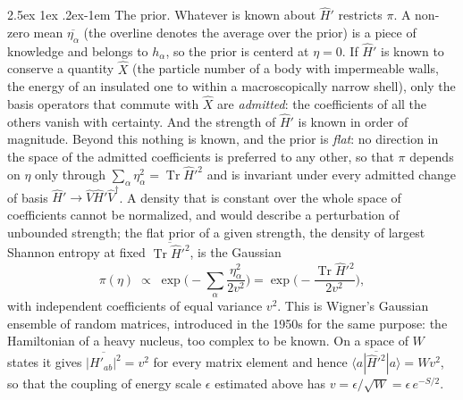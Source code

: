 \documentclass[10pt,a4paper]{article}
\makeatletter
\renewcommand{\paragraph}{\@startsection{paragraph}{4}{\z@}%
  {2.5ex \@plus 1ex \@minus .2ex}{-1em}%
  {\normalfont\fontsize{14pt}{17pt}\selectfont\bfseries}}
\newcommand{\Tr}{\operatorname{Tr}}
\makeatother
\begin{document}
\paragraph{The prior.}
Whatever is known about $ \hat H' $ restricts $ \pi $.
A non-zero mean $ \overline{\eta_\alpha} $ (the overline denotes the average over the prior) is a piece of knowledge and belongs to $ h_\alpha $, so the prior is centerd at $ \eta = 0 $.
If $ \hat H' $ is known to conserve a quantity $ \hat X $ (the particle number of a body with impermeable walls, the energy of an insulated one to within a macroscopically narrow shell), only the basis operators that commute with $ \hat X $ are \emph{admitted}: the coefficients of all the others vanish with certainty.
And the strength of $ \hat H' $ is known in order of magnitude.
Beyond this nothing is known, and the prior is \emph{flat}: no direction in the space of the admitted coefficients is preferred to any other, so that $ \pi $ depends on $ \eta $ only through $ \sum_\alpha\eta_\alpha^{2} = \Tr\hat H'^{2} $ and is invariant under every admitted change of basis $ \hat H' \to \hat V\hat H'\hat V^\dagger $.
A density that is constant over the whole space of coefficients cannot be normalized, and would describe a perturbation of unbounded strength; the flat prior of a given strength, the density of largest Shannon entropy at fixed $ \overline{\Tr\hat H'^{2}} $, is the Gaussian
\begin{equation}\label{eq:flat_prior}
  \pi(\eta) \;\propto\; \exp\Big(-\sum_\alpha\frac{\eta_\alpha^{2}}{2v^{2}}\Big)
  = \exp\Big(-\frac{\Tr\hat H'^{2}}{2v^{2}}\Big) ,
\end{equation}
with independent coefficients of equal variance $ v^{2} $.
This is Wigner's Gaussian ensemble of random matrices, introduced in the 1950s for the same purpose: the Hamiltonian of a heavy nucleus, too complex to be known.
On a space of $ W $ states it gives $ \overline{|H'_{ab}|^{2}} = v^{2} $ for every matrix element and hence $ \overline{\langle a|\hat H'^{2}|a\rangle} = Wv^{2} $, so that the coupling of energy scale $ \epsilon $ estimated above has $ v = \epsilon/\sqrt W = \epsilon\,e^{-S/2} $.
\end{document}

